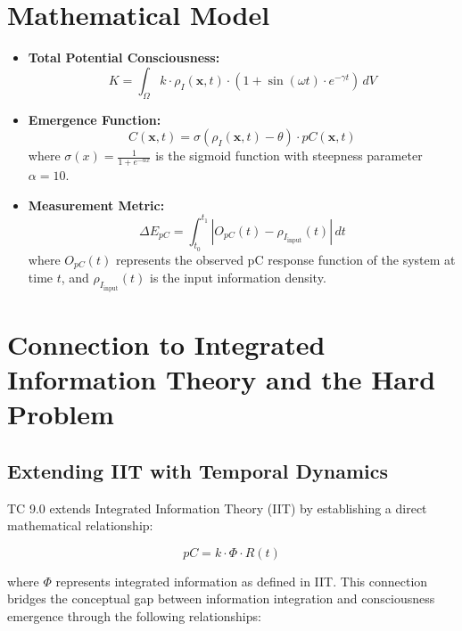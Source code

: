 \documentclass[12pt]{article}
\begin{document}
\section{Mathematical Model}
\begin{itemize}
    \item \textbf{Total Potential Consciousness:} 
    \begin{equation}
    K = \int_{\Omega} k \cdot \rho_I(\mathbf{x}, t) \cdot \left(1 + \sin(\omega t) \cdot e^{-\gamma t}\right) \, dV
    \end{equation}
    
    \item \textbf{Emergence Function:} 
    \begin{equation}
    C(\mathbf{x}, t) = \sigma(\rho_I(\mathbf{x}, t) - \theta) \cdot pC(\mathbf{x}, t)
    \end{equation}
    where $\sigma(x) = \frac{1}{1 + e^{-\alpha x}}$ is the sigmoid function with steepness parameter $\alpha = 10$.
    
    \item \textbf{Measurement Metric:} 
    \begin{equation}
    \Delta E_{pC} = \int_{t_0}^{t_1} |O_{pC}(t) - \rho_{I_{\text{input}}}(t)| \, dt
    \end{equation}
    where $O_{pC}(t)$ represents the observed pC response function of the system at time $t$, and $\rho_{I_{\text{input}}}(t)$ is the input information density.
\end{itemize}

\section{Connection to Integrated Information Theory and the Hard Problem}

\subsection{Extending IIT with Temporal Dynamics}
TC 9.0 extends Integrated Information Theory (IIT) \cite{tononi2008,tononi2016} by establishing a direct mathematical relationship:

\begin{equation}
pC = k \cdot \Phi \cdot R(t)
\end{equation}

where $\Phi$ represents integrated information as defined in IIT. This connection bridges the conceptual gap between information integration and consciousness emergence through the following relationships:
\end{document}
